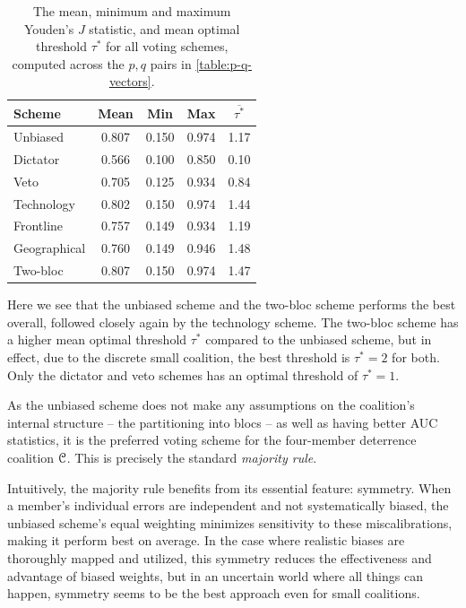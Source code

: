 \begin{table}[h!]
\centering
\begin{tabular}{lcccc}
\hline
\textbf{Scheme} 
& \textbf{Mean} 
& \textbf{Min} 
& \textbf{Max} 
& \textbf{$\overline{\tau^*}$} \\
\hline
Unbiased      
& 0.807 
& 0.150 
& 0.974 
& 1.17 \\

Dictator      
& 0.566 
& 0.100 
& 0.850 
& 0.10 \\

Veto          
& 0.705 
& 0.125 
& 0.934 
& 0.84 \\

Technology    
& 0.802 
& 0.150 
& 0.974 
& 1.44 \\

Frontline     
& 0.757 
& 0.149 
& 0.934 
& 1.19 \\

Geographical  
& 0.760 
& 0.149 
& 0.946 
& 1.48 \\

Two-bloc      
& 0.807 
& 0.150 
& 0.974 
& 1.47 \\
\hline
\end{tabular}
\caption{The mean, minimum and maximum Youden's $J$ statistic, and mean optimal threshold $\tau^*$ for all voting schemes, computed across the $p,q$ pairs in \cref{table:p-q-vectors}.}
\label{table:J-statistics}
\end{table}

Here we see that the unbiased scheme and the two-bloc scheme performs the best overall, followed closely again by the technology scheme. The two-bloc scheme has a higher mean optimal threshold $\tau^*$ compared to the unbiased scheme, but in effect, due to the discrete small coalition, the best threshold is $\tau^* = 2$ for both. Only the dictator and veto schemes has an optimal threshold of $\tau^* = 1$. 

As the unbiased scheme does not make any assumptions on the coalition's internal structure -- the partitioning into blocs -- as well as having better AUC statistics, it is the preferred voting scheme for the four-member deterrence coalition $\EuScript{C}$. This is precisely the standard \emph{majority rule}. 

Intuitively, the majority rule benefits from its essential feature: symmetry. When a member's individual errors are independent and not systematically biased, the unbiased scheme's equal weighting minimizes sensitivity to these miscalibrations, making it perform best on average. In the case where realistic biases are thoroughly mapped and utilized, this symmetry reduces the effectiveness and advantage of biased weights, but in an uncertain world where all things can happen, symmetry seems to be the best approach even for small coalitions. 


